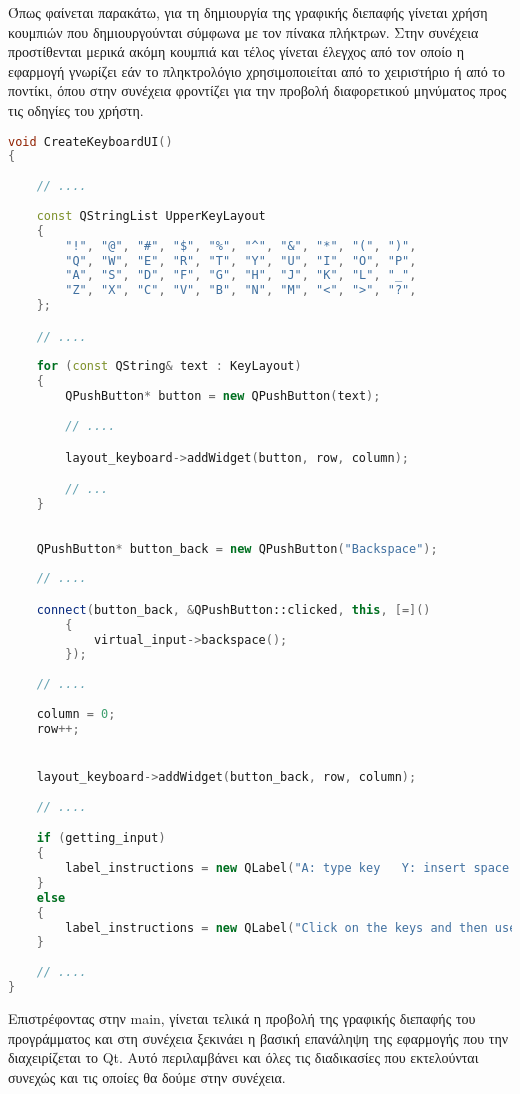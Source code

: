 Όπως φαίνεται παρακάτω, για τη δημιουργία της γραφικής διεπαφής γίνεται χρήση κουμπιών που δημιουργούνται
σύμφωνα με τον πίνακα πλήκτρων. Στην συνέχεια προστίθενται μερικά ακόμη κουμπιά και τέλος γίνεται έλεγχος 
από τον οποίο η εφαρμογή γνωρίζει εάν το πληκτρολόγιο χρησιμοποιείται από το χειριστήριο ή από το ποντίκι,
όπου στην συνέχεια φροντίζει για την προβολή διαφορετικού μηνύματος προς τις οδηγίες του χρήστη.

\begin{lstlisting}[language=C++, style=cppstyle]
void CreateKeyboardUI()
{
    
    // ....
    
    const QStringList UpperKeyLayout
    {
        "!", "@", "#", "$", "%", "^", "&", "*", "(", ")",
        "Q", "W", "E", "R", "T", "Y", "U", "I", "O", "P",
        "A", "S", "D", "F", "G", "H", "J", "K", "L", "_",
        "Z", "X", "C", "V", "B", "N", "M", "<", ">", "?",
    };

    // ....
    
    for (const QString& text : KeyLayout)
    {
        QPushButton* button = new QPushButton(text);
        
        // ....

        layout_keyboard->addWidget(button, row, column);

        // ...
    }
    
    
    QPushButton* button_back = new QPushButton("Backspace");
    
    // ....

    connect(button_back, &QPushButton::clicked, this, [=]()
        {
            virtual_input->backspace();
        });
    
    // ....
    
    column = 0;
    row++;


    layout_keyboard->addWidget(button_back, row, column);
    
    // ....

    if (getting_input)
    {
        label_instructions = new QLabel("A: type key   Y: insert space   X: Backspace   Start: send input", this);
    }
    else
    {
        label_instructions = new QLabel("Click on the keys and then use the copy button to save input to clipboard", this);
    }
    
    // ....
}
\end{lstlisting}

Επιστρέφοντας στην main, γίνεται τελικά η προβολή της γραφικής διεπαφής του προγράμματος και στη συνέχεια
ξεκινάει η βασική επανάληψη της εφαρμογής που την διαχειρίζεται το Qt. Αυτό περιλαμβάνει και όλες τις διαδικασίες
που εκτελούνται συνεχώς και τις οποίες θα δούμε στην συνέχεια.

